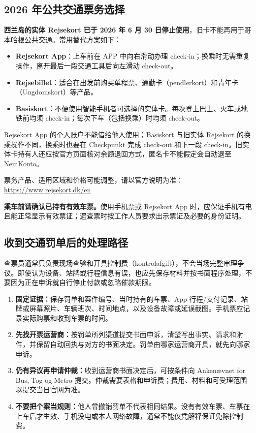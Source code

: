\subsection{2026 年公共交通票务选择}\label{sec:rejsekort}

\textbf{西兰岛的实体 Rejsekort 已于 2026 年 6 月 30 日停止使用}，旧卡不能再用于哥本哈根公共交通。常用替代方案如下：

\begin{itemize}[leftmargin=1.5em]
  \item \textbf{Rejsekort App}：上车前在 APP 中向右滑动办理 check-in；换乘时无需重复操作，离开最后一段交通工具后向左滑动 check-out。
  \item \textbf{Rejsebillet}：适合在出发前购买单程票、通勤卡（pendlerkort）和青年卡（Ungdomskort）等产品。
  \item \textbf{Basiskort}：不便使用智能手机者可选择的实体卡。每次登上巴士、火车或地铁前均须 check-in；每次下车（包括换乘）时均须 check-out。
\end{itemize}

Rejsekort App 的个人账户不能借给他人使用；Basiskort 与旧实体 Rejsekort 的换乘操作不同，换乘时也要在 Checkpunkt 完成 check-out 和下一段 check-in。旧实体卡持有人还应按官方页面核对余额退回方式，匿名卡不能假定会自动退至 NemKonto。

票务产品、适用区域和价格可能调整，请以官方说明为准：
\url{https://www.rejsekort.dk/en}

\begin{grayleftbox}
\textbf{乘车前请确认已持有有效车票。}使用手机票或 Rejsekort App 时，应保证手机有电且能正常显示有效票证；遇查票时按工作人员要求出示票证及必要的身份证明。
\end{grayleftbox}

\subsection{收到交通罚单后的处理路径}

查票员通常只负责现场查验和开具控制费（kontrolafgift），不会当场完整审理争议。即使认为设备、站牌或行程信息有误，也应先保存材料并按书面程序处理，不要因为正在申诉就自行停止付款或忽略催款期限。

\begin{enumerate}[leftmargin=2.2em,label=\arabic*.,itemsep=3pt]
  \item \textbf{固定证据：}保存罚单和案件编号、当时持有的车票、App 行程/支付记录、站牌或屏幕照片、车辆班次、时间地点，以及设备故障或延误截图。手机票应记录实际购票和收到车票的时间。
  \item \textbf{先找开票运营商：}按罚单所列渠道提交书面申诉，清楚写出事实、请求和附件，并保留自动回执与对方的书面决定。罚单由哪家运营商开具，就先向哪家申诉。
  \item \textbf{仍有异议再申请仲裁：}收到运营商书面决定后，可按条件向 Ankenævnet for Bus, Tog og Metro 提交。仲裁需要表格和申诉费；费用、材料和可受理范围以提交当日官网为准。
  \item \textbf{不要把个案当规则：}他人曾撤销罚单不代表相同结果。没有有效车票、车票在上车后才生效、手机没电或本人网络故障，通常不能仅凭解释保证免除控制费。
\end{enumerate}

